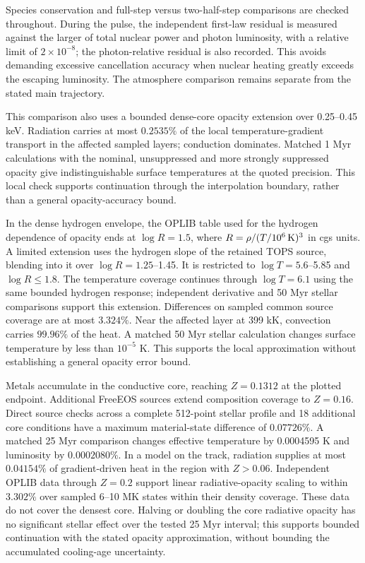 \documentclass[11pt,letterpaper]{article}
\begin{document}
Species conservation and full-step versus two-half-step comparisons are
checked throughout. During the pulse, the independent first-law residual
is measured against the larger of total nuclear power and photon luminosity,
with a relative limit of $2\times10^{-8}$; the photon-relative residual is
also recorded. This avoids demanding excessive cancellation accuracy when
nuclear heating greatly exceeds the escaping luminosity. The atmosphere
comparison remains separate from the stated main trajectory.

This comparison also uses a bounded dense-core opacity extension over
0.25--0.45 keV. Radiation carries at most $0.2535\%$ of the local
temperature-gradient transport in the affected sampled layers; conduction
dominates. Matched 1 Myr calculations with the nominal, unsuppressed and
more strongly suppressed opacity give indistinguishable surface temperatures
at the quoted precision. This local check supports continuation through
the interpolation boundary, rather than a general opacity-accuracy bound.


In the dense hydrogen envelope, the OPLIB table used for the hydrogen
dependence of opacity ends at $\log R=1.5$, where
$R=\rho/(T/10^6\,{\rm K})^3$ in cgs units. A limited extension uses the
hydrogen slope of the retained TOPS source, blending into it over
$\log R=1.25$--1.45. It is restricted to $\log T=5.6$--5.85 and
$\log R\leq1.8$. The temperature coverage continues through
$\log T=6.1$ using the same bounded hydrogen response; independent
derivative and 50 Myr stellar comparisons support this extension. Differences on sampled common source coverage are at
most $3.324\%$. Near the affected layer at 399 kK, convection carries
$99.96\%$ of the heat. A matched 50 Myr stellar calculation changes
surface temperature by less than $10^{-5}$ K. This supports the local
approximation without establishing a general opacity error bound.



Metals accumulate in the conductive core, reaching $Z=0.1312$ at the
plotted endpoint. Additional FreeEOS sources extend composition coverage
to $Z=0.16$. Direct source checks across a complete 512-point stellar profile and
18 additional core conditions have a maximum material-state difference
of $0.07726\%$. A matched 25 Myr comparison changes effective temperature
by 0.0004595 K and luminosity by $0.0002080\%$.
In a model on the track, radiation supplies at most $0.04154\%$ of
gradient-driven heat in the region with $Z>0.06$. Independent OPLIB data through $Z=0.2$ support
linear radiative-opacity scaling to within $3.302\%$ over sampled
6--10 MK states within their density coverage. These data do not cover
the densest core. Halving or doubling the core radiative opacity has
no significant stellar effect over the tested 25 Myr interval; this
supports bounded continuation with the stated opacity approximation,
without bounding the accumulated cooling-age uncertainty.
\end{document}
